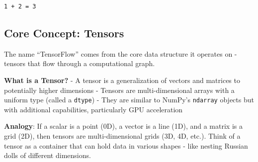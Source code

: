\documentclass[
  letterpaper,
  DIV=11,
  numbers=noendperiod]{scrreprt}
\begin{document}
\begin{verbatim}
1 + 2 = 3
\end{verbatim}

\subsection{Core Concept: Tensors}\label{core-concept-tensors}

The name ``TensorFlow'' comes from the core data structure it operates
on - tensors that flow through a computational graph.

\textbf{What is a Tensor?} - A tensor is a generalization of vectors and
matrices to potentially higher dimensions - Tensors are
multi-dimensional arrays with a uniform type (called a \texttt{dtype}) -
They are similar to NumPy's \texttt{ndarray} objects but with additional
capabilities, particularly GPU acceleration

\textbf{Analogy}: If a scalar is a point (0D), a vector is a line (1D),
and a matrix is a grid (2D), then tensors are multi-dimensional grids
(3D, 4D, etc.). Think of a tensor as a container that can hold data in
various shapes - like nesting Russian dolls of different dimensions.
\end{document}
